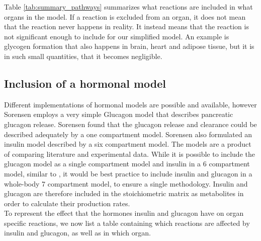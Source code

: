 \documentclass{IEEEtran}
\begin{document}
Table \ref{tab:summary_pathways} summarizes what reactions are included in what organs in the model. If a reaction is excluded from an organ, it does not mean that the reaction never happens in reality. It instead means that the reaction is not significant enough to include for our simplified model. An example is glycogen formation that also happens in brain, heart and adipose tissue, but it is in such small quantities, that it becomes negligible. \\




\subsection{Inclusion of a hormonal model}
\label{sec:hormonal_model}


Different implementations of hormonal models are possible and available, however Sorensen \cite{sorensen_1978} employs a very simple Glucagon model that describes pancreatic glucagon release. Sorensen found that the glucagon release and clearance could be described adequately by a one compartment model. Sorensen also formulated an insulin model described by a six compartment model. The models are a product of comparing literature and experimental data.
While it is possible to include the glucagon model as a single compartment model and insulin in a 6 compartment model, similar to \cite{panunzi_pompa_borri_piemonte_gaetano_2020,sorensen_1978}, it would be best practice to include insulin and glucagon in a whole-body 7 compartment model, to ensure a single methodology. Insulin and glucagon are therefore included in the stoichiometric matrix as metabolites in order to calculate their production rates. \\

To represent the effect that the hormones insulin and glucagon have on organ specific reactions, we now list a table containing which reactions are affected by insulin and glucagon, as well as in which organ. \\
\end{document}
